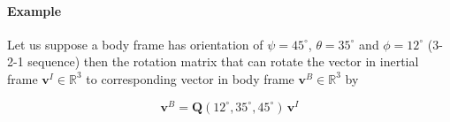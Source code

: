 \documentclass[12pt, a4paper]{article}
\begin{document}
\paragraph{Example} Let us suppose a body frame has orientation of $\psi = 45^{\circ}$, $\theta = 35^{\circ}$ and $\phi = 12^{\circ}$ (3-2-1 sequence) then the rotation matrix that can rotate the vector in inertial frame $\bm{v}^{I}\in \mathbb{R}^{3}$ to corresponding vector in body frame $\bm{v}^{B}\in \mathbb{R}^{3}$ by

\begin{equation}
\bm{v}^{B} = \bm{Q}(12^{\circ},35^{\circ},45^{\circ})\,\bm{v}^{I}
\end{equation}
\end{document}
